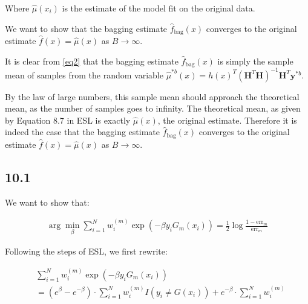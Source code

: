 \documentclass[a4paper, 12pt]{article}
\begin{document}
Where $\hat{\mu}(x_i)$ is the estimate of the model fit on the original data.

We want to show that the bagging estimate $\hat{f}_{\text{bag}}(x)$ converges to the original estimate $\hat{f}(x) = \hat{\mu}(x)$ as $B \to \infty$.

It is clear from \autoref{eq2} that the bagging estimate $\hat{f}_{\text{bag}}(x)$ is simply the sample mean of samples from the random variable $\hat{\mu}^{*b}(x) = {h(x)}^T (\mathbf{H}^T \mathbf{H})^{-1} \mathbf{H}^T \mathbf{y}^{*b}$.

By the law of large numbers, this sample mean should approach the theoretical mean, as the number of samples goes to infinity. The theoretical mean, as given by Equation 8.7 in ESL is exactly $\hat{\mu}(x)$, the original estimate. Therefore it is indeed the case that the bagging estimate $\hat{f}_{\text{bag}}(x)$ converges to the original estimate $\hat{f}(x) = \hat{\mu}(x)$ as $B \to \infty$.

%

\subsection{10.1}

We want to show that:

\begin{align}
	\arg \min_{\beta} \sum_{i=1}^N w_i^{(m)} \exp(-\beta y_i G_m(x_i)) = \frac{1}{2} \log \frac{1 - \text{err}_m}{\text{err}_m}
\end{align}

Following the steps of ESL, we first rewrite:

\begin{align}
	&\sum_{i=1}^N w_i^{(m)} \exp(-\beta y_i G_m(x_i))\\
	&= \left(e^{\beta}-e^{-\beta}\right) \cdot \sum_{i=1}^{N} w_{i}^{(m)} I\left(y_{i} \neq G\left(x_{i}\right)\right)+e^{-\beta} \cdot \sum_{i=1}^{N} w_{i}^{(m)}
\end{align}
\end{document}
